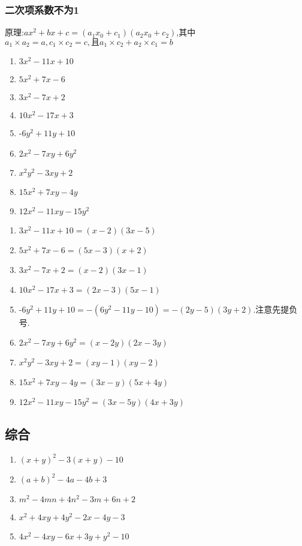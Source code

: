 \documentclass[cn,blue]{elegantbook}
\begin{document}
\subsubsection{二次项系数不为1}%
原理:\(ax^2 +bx+c=(a_1x_0+c_1)(a_2x_0+c_2)\),其中\(a_1\times a_2=a, c_1\times c_2=c,\text{且}a_1\times c_2+a_2\times c_1=b\)
\begin{problem}
    \begin{enumerate}
        \item \(3x^2 -11x+10\)
        \item \(5x^2 +7x-6\)
        \item \(3x^2 -7x+2\)
        \item \(10x^2 -17x+3\)
        \item -\(6y^2 +11y+10\)
        \item \(2x^2 -7xy+6y^2\)
        \item \(x^2 y^2-3xy+2\)
        \item \(15x^2 +7xy-4y\)
        \item \(12x^2 -11xy-15y^2\)
    \end{enumerate}
\end{problem}

\begin{solution}
    \begin{enumerate}
        \item \(3x^2 -11x+10=(x-2)(3x-5)\)
        \item \(5x^2 +7x-6=(5x-3)(x+2)\)
        \item \(3x^2 -7x+2=(x-2)(3x-1)\)
        \item \(10x^2 -17x+3=(2x-3)(5x-1)\)
        \item -\(6y^2 +11y+10=-(6y^2-11y-10)=-(2y-5)(3y+2)\).注意先提负号.
        \item \(2x^2 -7xy+6y^2=(x-2y)(2x-3y)\)
        \item \(x^2 y^2-3xy+2=(xy-1)(xy-2)\)
        \item \(15x^2 +7xy-4y=(3x-y)(5x+4y)\)
        \item \(12x^2 -11xy-15y^2=(3x-5y)(4x+3y)\)
    \end{enumerate}
\end{solution}

\subsection{综合}%
\label{sub:综合}
\begin{problem}
    \begin{enumerate}
        \item \((x+y)^2-3(x+y)-10\)
        \item \((a+b)^2-4a-4b+3\)
        \item \(m^2-4mn+4n^2-3m+6n+2\)
        \item \(x^2 +4xy+4y^2-2x-4y-3\)
        \item \(4x^2-4xy-6x+3y+y^2-10\)
    \end{enumerate}
\end{problem}
\end{document}
